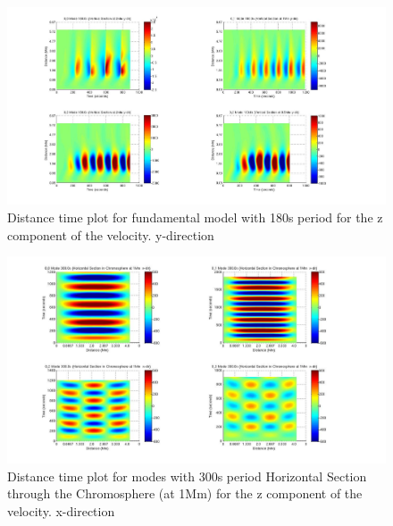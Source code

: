 \documentclass[final,1p]{elsarticle}
\begin{document}
\begin{figure}[h]
\includegraphics[scale=0.3]{imagesn/dt_180_vert_y.jpg}
\caption{Distance time plot for fundamental model with 180s period for the z component of the velocity.  y-direction}
\end{figure}



\begin{figure}[h]
\includegraphics[scale=0.3]{imagesn/dt_300_0_0_hor_x_1Mm.jpg}
\caption{Distance time plot for modes with 300s period Horizontal Section through the Chromosphere (at 1Mm) for the z  component of the velocity. x-direction}
\end{figure}
\end{document}
